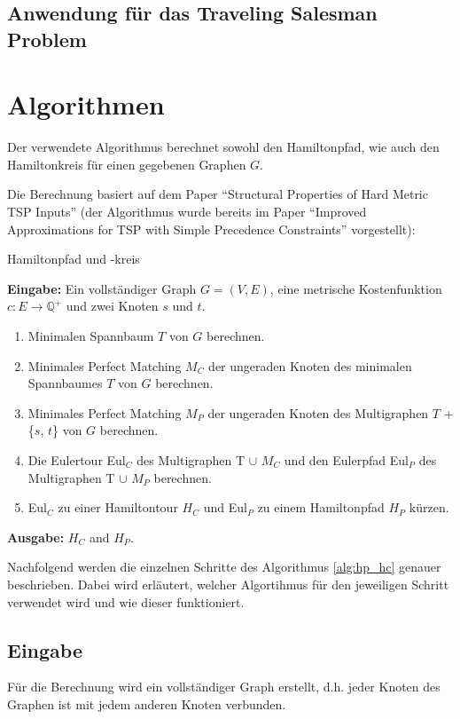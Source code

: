 \documentclass[11pt,a4paper]{article}
\begin{document}
\subsection{Anwendung für das Traveling Salesman Problem}

\newpage
\section{Algorithmen}
\label{s:algorithmen}
Der verwendete Algorithmus berechnet sowohl den Hamiltonpfad, wie auch den Hamiltonkreis für einen gegebenen Graphen $G$. 

Die Berechnung basiert auf dem Paper "`Structural Properties of Hard Metric TSP Inputs"'\cite{moemke11} (der Algorithmus wurde bereits im Paper "`Improved Approximations for TSP with Simple Precedence Constraints"'\cite{boeckenhauer10} vorgestellt):

\begin{algorithm}
    \caption{Hamiltonpfad und -kreis \cite{moemke11}}
    \label{alg:hp_hc}
\textbf{Eingabe:} Ein vollständiger Graph $G = (V,E)$, eine metrische Kostenfunktion $c: E \rightarrow \mathbb{Q}^+$ und zwei Knoten $s$ und $t$.
    \begin{enumerate} \item Minimalen Spannbaum $T$ von $G$ berechnen.
        \item Minimales Perfect Matching $M_C$ der ungeraden Knoten des minimalen Spannbaumes $T$ von $G$ berechnen.
        \item Minimales Perfect Matching $M_P$ der ungeraden Knoten des Multigraphen $T$ + \{$s$, $t$\} von $G$ berechnen.
        \item Die Eulertour Eul$_C$ des Multigraphen T $\cup$ $M_C$ und den Eulerpfad Eul$_P$ des Multigraphen T $\cup$ $M_P$ berechnen.
        \item Eul$_C$ zu einer Hamiltontour $H_C$ und Eul$_P$ zu einem Hamiltonpfad $H_P$ kürzen.
    \end{enumerate}
\textbf{Ausgabe:} $H_C$ and $H_P$.

\end{algorithm}

Nachfolgend werden die einzelnen Schritte des Algorithmus \ref{alg:hp_hc} genauer beschrieben. Dabei wird erläutert, welcher Algortihmus für den jeweiligen Schritt verwendet wird und wie dieser funktioniert.

\subsection{Eingabe}
Für die Berechnung wird ein vollständiger Graph erstellt, d.h. jeder Knoten des Graphen ist mit jedem anderen Knoten verbunden.
\end{document}
